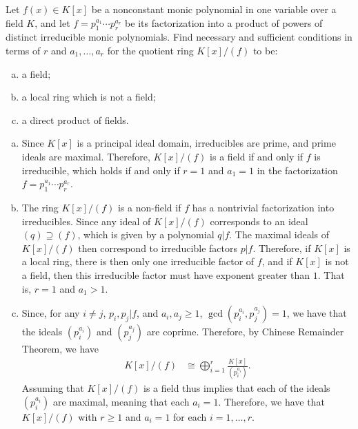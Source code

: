 \documentclass[10pt]{mypackage}
\begin{document}
\begin{problem}[Problem 5]
  Let $f(x)\in K[x]$ be a nonconstant monic polynomial in one variable over a field $K$, and let $f = p_1^{a_1}\cdots p_r^{a_r}$ be its factorization into a product of powers of distinct irreducible monic polynomials. Find necessary and sufficient conditions in terms of $r$ and $a_1,\dots,a_r$ for the quotient ring $K[x]/\left( f \right)$ to be:
  \begin{enumerate}[(a)]
    \item a field;
    \item a local ring which is not a field;
    \item a direct product of fields.
  \end{enumerate}
\end{problem}
\begin{solution}\hfill
  \begin{enumerate}[(a)]
    \item Since $K[x]$ is a principal ideal domain, irreducibles are prime, and prime ideals are maximal. Therefore, $K[x]/\left( f \right)$ is a field if and only if $f$ is irreducible, which holds if and only if $r = 1$ and $a_1 = 1$ in the factorization $f = p_1^{a_1}\cdots p_r^{a_r}$.
    \item The ring $K[x]/\left( f \right)$ is a non-field if $f$ has a nontrivial factorization into irreducibles. Since any ideal of $K[x]/\left( f \right)$ corresponds to an ideal $\left( q \right)\supseteq \left( f \right)$, which is given by a polynomial $q | f$. The maximal ideals of $K[x]/\left( f \right)$ then correspond to irreducible factors $p | f$. Therefore, if $K[x]$ is a local ring, there is then only one irreducible factor of $f$, and if $K[x]$ is not a field, then this irreducible factor must have exponent greater than $1$. That is, $r = 1$ and $a_1 > 1$.
    \item Since, for any $i\neq j$, $p_i,p_j | f$, and $a_i,a_j \geq 1$, $\gcd\left( p_i^{a_i},p_j^{a_j} \right) = 1$, we have that the ideals $\left( p_i^{a_i} \right)$ and $\left( p_j^{a_j} \right)$ are coprime. Therefore, by Chinese Remainder Theorem, we have
      \begin{align*}
        K[x]/\left( f \right)  &\cong \bigoplus_{i=1}^{r} \frac{K[x]}{\left( p_i^{a_i} \right)}.
      \end{align*}
      Assuming that $K[x]/\left( f \right)$ is a field thus implies that each of the ideals $\left( p_i^{a_i} \right)$ are maximal, meaning that each $a_i = 1$. Therefore, we have that $K[x]/\left( f \right)$ with $r \geq 1$ and $a_i = 1$ for each $i=1,\dots,r$.
  \end{enumerate}
\end{solution}
\end{document}
